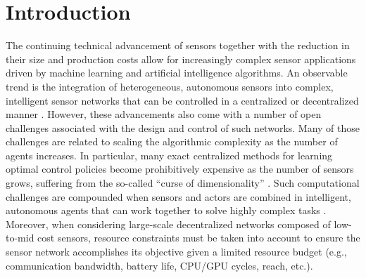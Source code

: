 \documentclass[letterpaper]{article} %
\begin{document}
\section{Introduction}
The continuing technical advancement of sensors together with the reduction in their size and production costs allow for increasingly complex sensor applications driven by machine learning and artificial intelligence algorithms.
An observable trend is the integration of heterogeneous, autonomous sensors into complex, intelligent sensor networks that can be controlled in a centralized \cite{chen2019iraf} or decentralized manner \cite{wang2020federated}.
However, these advancements also come with a number of open challenges associated with the design and control of such networks.
Many of those challenges are related to scaling the algorithmic complexity as the number of agents increases.
In particular, many exact centralized methods for learning optimal control policies become prohibitively expensive as the number of sensors grows, suffering from the so-called ``curse of dimensionality'' \cite{Boutilier1996mmdp}.
Such computational challenges are compounded when sensors and actors are combined in intelligent, autonomous agents that can work together to solve highly complex tasks \cite{baker2019emergent}.
Moreover, when considering large-scale decentralized networks composed of low-to-mid cost sensors, resource constraints must be taken into account to ensure the sensor network accomplishes its objective given a limited resource budget (e.g., communication bandwidth, battery life, CPU/GPU cycles, reach, etc.).
\end{document}
